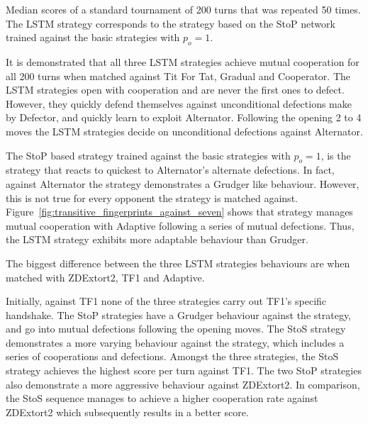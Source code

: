 \begin{table}[!htbp]
    \begin{center}
    \resizebox{\textwidth}{!}{
        
    }
\end{center}
\caption{Median scores of a standard tournament of 200 turns that was repeated
50 times. The LSTM strategy corresponds to the strategy based on the StoP
network trained against the basic strategies with
$p_o=1$.}\label{table:scores_s_to_p_basic_against_seven}
\end{table}

It is demonstrated that all three LSTM strategies achieve mutual cooperation for
all 200 turns when matched against Tit For Tat, Gradual and Cooperator. The LSTM
strategies open with cooperation and are never the first ones to defect.
However, they quickly defend themselves against unconditional defections make by
Defector, and quickly learn to exploit Alternator. Following the opening 2 to 4
moves the LSTM strategies decide on unconditional defections against Alternator.

The StoP based strategy trained against the basic strategies with $p_o=1$, is
the strategy that reacts to quickest to Alternator's alternate defections. In
fact, against Alternator the strategy demonstrates a Grudger like behaviour.
However, this is not true for every opponent the strategy is matched against.
Figure~\ref{fig:transitive_fingerprints_against_seven} shows that strategy
manages mutual cooperation with Adaptive following a series of mutual
defections. Thus, the LSTM strategy exhibits more adaptable behaviour than
Grudger.

The biggest difference between the three LSTM strategies behaviours are when
matched with ZDExtort2, TF1 and Adaptive.

Initially, against TF1 none of the three strategies carry out TF1's specific
handshake. The StoP strategies have a Grudger behaviour against the strategy,
and go into mutual defections following the opening moves. The StoS strategy
demonstrates a more varying behaviour against the strategy, which includes a
series of cooperations and defections. Amongst the three strategies, the StoS
strategy achieves the highest score per turn against TF1. The two StoP
strategies also demonstrate a more aggressive behaviour against ZDExtort2. In
comparison, the StoS sequence manages to achieve a higher cooperation rate
against ZDExtort2 which subsequently results in a better score.

